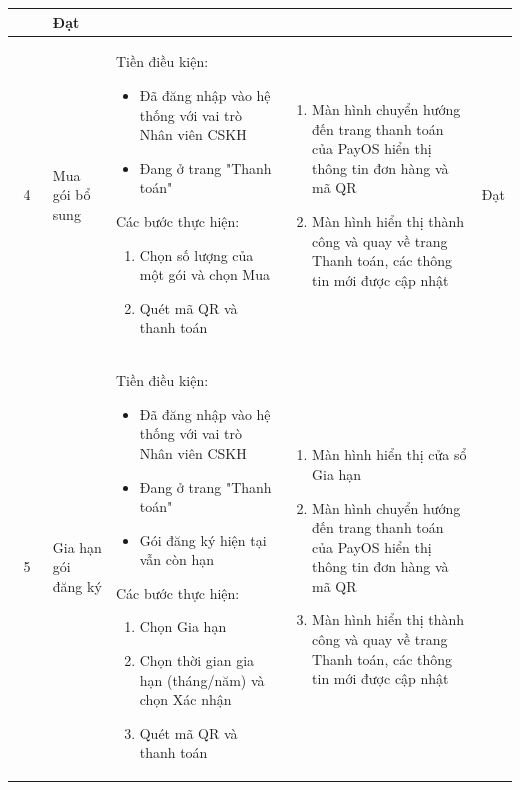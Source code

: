 \begin{longtable}{|c|m{2.5cm}|m{5.5cm}|m{4.5cm}|c|}
\begin{enumerate}[label=\arabic*.]
    \end{enumerate} & Đạt \\
    \hline
    4 & 
    Mua gói bổ sung& 
    Tiền điều kiện:
    \begin{itemize}
        \item Đã đăng nhập vào hệ thống với vai trò Nhân viên CSKH
        \item Đang ở trang "Thanh toán"
    \end{itemize}
    Các bước thực hiện: 
    \begin{enumerate}[label=\arabic*.]
        \item Chọn số lượng của một gói và chọn Mua
        \item Quét mã QR và thanh toán
    \end{enumerate}
    & 
    \begin{enumerate}[label=\arabic*.]
        \item Màn hình chuyển hướng đến trang thanh toán của PayOS hiển thị thông tin đơn hàng và mã QR
        \item Màn hình hiển thị thành công và quay về trang Thanh toán, các thông tin mới được cập nhật
    \end{enumerate} & Đạt \\
    \hline
    5 & 
    Gia hạn gói đăng ký& 
    Tiền điều kiện:
    \begin{itemize}
        \item Đã đăng nhập vào hệ thống với vai trò Nhân viên CSKH
        \item Đang ở trang "Thanh toán"
        \item Gói đăng ký hiện tại vẫn còn hạn
    \end{itemize}
    Các bước thực hiện: 
    \begin{enumerate}[label=\arabic*.]
        \item Chọn Gia hạn
        \item Chọn thời gian gia hạn (tháng/năm) và chọn Xác nhận
        \item Quét mã QR và thanh toán
    \end{enumerate}
    & 
    \begin{enumerate}[label=\arabic*.]
        \item Màn hình hiển thị cửa sổ Gia hạn
        \item Màn hình chuyển hướng đến trang thanh toán của PayOS hiển thị thông tin đơn hàng và mã QR
        \item Màn hình hiển thị thành công và quay về trang Thanh toán, các thông tin mới được cập nhật

\end{enumerate}
\end{longtable}

